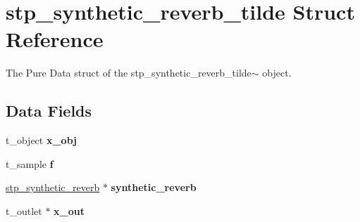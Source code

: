 \hypertarget{structstp__synthetic__reverb__tilde}{}\section{stp\+\_\+synthetic\+\_\+reverb\+\_\+tilde Struct Reference}
\label{structstp__synthetic__reverb__tilde}


The Pure Data struct of the stp\+\_\+synthetic\+\_\+reverb\+\_\+tilde$\sim$ object. ~\newline
  


\subsection*{Data Fields}
\begin{DoxyCompactItemize}
\item 
\mbox{\label{structstp__synthetic__reverb__tilde_aec9b618f42517cd6740f1d37dba87d0a}} 
t\+\_\+object {\bfseries x\+\_\+obj}
\item 
\mbox{\label{structstp__synthetic__reverb__tilde_a3b27de018058e7941a2f36d7a28c2cda}} 
t\+\_\+sample {\bfseries f}
\item 
\mbox{\label{structstp__synthetic__reverb__tilde_ae9ee90f6187b2875fa25fcbf75a85011}} 
\hyperlink{structstp__synthetic__reverb}{stp\+\_\+synthetic\+\_\+reverb} $\ast$ {\bfseries synthetic\+\_\+reverb}
\item 
\mbox{\label{structstp__synthetic__reverb__tilde_a355caa0c783dd907f180108bc18121fa}} 
t\+\_\+outlet $\ast$ {\bfseries x\+\_\+out}
\end{DoxyCompactItemize}
